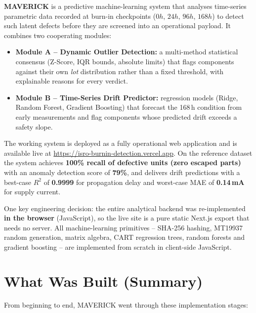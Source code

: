 \documentclass[11pt,a4paper]{article}
\begin{document}
\textbf{MAVERICK} is a predictive machine-learning system that analyses time-series parametric
data recorded at burn-in checkpoints ($0h$, $24h$, $96h$, $168h$) to detect such latent defects
before they are screened into an operational payload. It combines two cooperating modules:

\begin{itemize}[leftmargin=1.5em]
  \item \textbf{Module A -- Dynamic Outlier Detection:} a multi-method statistical consensus
        (Z-Score, IQR bounds, absolute limits) that flags components against their own \emph{lot}
        distribution rather than a fixed threshold, with explainable reasons for every verdict.
  \item \textbf{Module B -- Time-Series Drift Predictor:} regression models (Ridge, Random
        Forest, Gradient Boosting) that forecast the 168\,h condition from early measurements
        and flag components whose predicted drift exceeds a safety slope.
\end{itemize}

The working system is deployed as a fully operational web application and is available live at
\url{https://isro-burnin-detection.vercel.app}. On the reference dataset the system achieves
\textbf{100\% recall of defective units (zero escaped parts)} with an anomaly detection score of
\textbf{79\%}, and delivers drift predictions with a best-case $R^2$ of \textbf{0.9999} for
propagation delay and worst-case MAE of \textbf{0.14\,mA} for supply current.

One key engineering decision: the entire analytical backend was re-implemented \textbf{in the
browser} (JavaScript), so the live site is a pure static Next.js export that needs no server. All
machine-learning primitives -- SHA-256 hashing, MT19937 random generation, matrix algebra, CART
regression trees, random forests and gradient boosting -- are implemented from scratch in
client-side JavaScript.

\section{What Was Built (Summary)}
\label{sec:what}

From beginning to end, MAVERICK went through these implementation stages:
\end{document}
